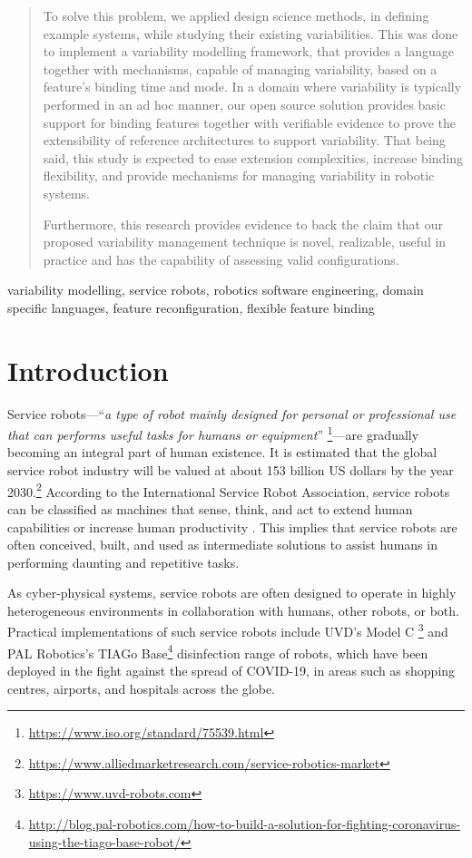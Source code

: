 \documentclass[conference]{IEEEtran}
\newcommand{\foot}[1]{\footnote{\url{#1}}}
\begin{document}
\begin{abstract}
To solve this problem, we applied design science methods, in defining example systems, while studying their existing variabilities. This was done to implement a variability modelling framework, that provides a language together with mechanisms, capable of managing variability, based on a feature's binding time and mode. In a domain where variability is typically performed in an ad hoc manner, our open source solution provides basic support for binding features together with verifiable evidence to prove the extensibility of reference architectures to support variability. That being said, this study is expected to ease extension complexities, increase binding flexibility, and provide mechanisms for managing variability in robotic systems.

Furthermore, this research provides evidence to back the claim that our proposed variability management technique is novel, realizable, useful in practice and has the capability of assessing valid configurations.
\end{abstract}

\begin{IEEEkeywords}
variability modelling, service robots, robotics software engineering, domain specific languages, feature reconfiguration, flexible feature binding
\end{IEEEkeywords}

\section{Introduction}
\label{section:intro}
Service robots---``{\em a type of robot mainly designed for personal or professional use that can performs useful tasks for humans or equipment}'' \foot{https://www.iso.org/standard/75539.html}---are gradually becoming an integral part of human existence. It is estimated that the global service robot industry will be valued at about 153 billion US dollars by the year 2030.\foot{https://www.alliedmarketresearch.com/service-robotics-market}
According to the International Service Robot Association, service robots can be classified as machines that sense, think, and act to extend human capabilities or increase human productivity \cite{serv-rob-his}. This implies that service robots are often conceived, built, and used as intermediate solutions to assist humans in performing daunting and repetitive tasks.

As cyber-physical systems, service robots are often designed to operate in highly heterogeneous environments in collaboration with humans, other robots, or both. Practical implementations of such service robots include UVD's Model C \foot{https://www.uvd-robots.com} and PAL Robotics's TIAGo Base\foot{http://blog.pal-robotics.com/how-to-build-a-solution-for-fighting-coronavirus-using-the-tiago-base-robot/} 
disinfection range of robots, which have been deployed in the fight against the spread of COVID-19, in areas such as shopping centres, airports, and hospitals across the globe.
\end{document}
